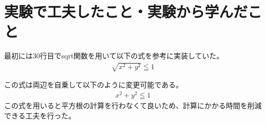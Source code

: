 

\section{実験で工夫したこと・実験から学んだこと}
最初には30行目でsqrt関数を用いて以下の式を参考に実装していた。
\begin{align*}
  \sqrt{x^2 + y^2} \leqq 1
\end{align*}

この式は両辺を自乗して以下のように変更可能である。
\begin{align*}
  x^2 + y^2 \leqq 1
\end{align*}
この式を用いると平方根の計算を行わなくて良いため、計算にかかる時間を削減できる工夫を行った。


